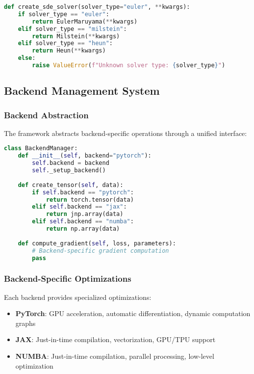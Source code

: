 \begin{lstlisting}[language=Python, caption=SDE Solver Factory Functions]
def create_sde_solver(solver_type="euler", **kwargs):
    if solver_type == "euler":
        return EulerMaruyama(**kwargs)
    elif solver_type == "milstein":
        return Milstein(**kwargs)
    elif solver_type == "heun":
        return Heun(**kwargs)
    else:
        raise ValueError(f"Unknown solver type: {solver_type}")
\end{lstlisting}

\subsection{Backend Management System}

\subsubsection{Backend Abstraction}

The framework abstracts backend-specific operations through a unified interface:

\begin{lstlisting}[language=Python, caption=Backend Abstraction]
class BackendManager:
    def __init__(self, backend="pytorch"):
        self.backend = backend
        self._setup_backend()
    
    def create_tensor(self, data):
        if self.backend == "pytorch":
            return torch.tensor(data)
        elif self.backend == "jax":
            return jnp.array(data)
        elif self.backend == "numba":
            return np.array(data)
    
    def compute_gradient(self, loss, parameters):
        # Backend-specific gradient computation
        pass
\end{lstlisting}

\subsubsection{Backend-Specific Optimizations}

Each backend provides specialized optimizations:

\begin{itemize}
    \item \textbf{PyTorch}: GPU acceleration, automatic differentiation, dynamic computation graphs
    \item \textbf{JAX}: Just-in-time compilation, vectorization, GPU/TPU support
    \item \textbf{NUMBA}: Just-in-time compilation, parallel processing, low-level optimization
\end{itemize}

